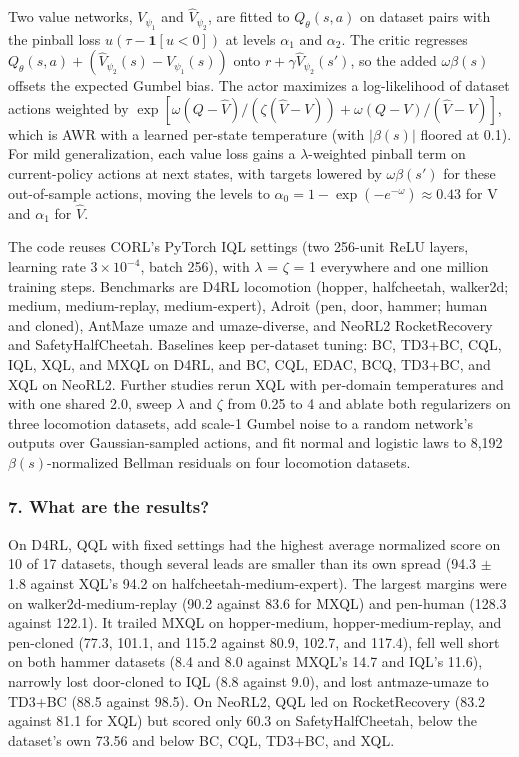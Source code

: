 \documentclass[11pt]{article}
\newcommand{\question}[1]{\subsubsection*{#1}}
\begin{document}
Two value networks, $V_{\psi_1}$ and $\hat{V}_{\psi_2}$, are fitted to $Q_\theta(s, a)$ on dataset pairs with the pinball loss $u(\tau - \mathbf{1}[u < 0])$ at levels $\alpha_{1}$ and $\alpha_{2}$. The critic regresses $Q_\theta(s, a) + (\hat{V}_{\psi_2}(s) - V_{\psi_1}(s))$ onto $r + \gamma \hat{V}_{\psi_2}(s')$, so the added $\omega\beta(s)$ offsets the expected Gumbel bias. The actor maximizes a log-likelihood of dataset actions weighted by $\exp[\omega(Q - \hat{V})/(\zeta(\hat{V} - V)) + \omega(Q - V)/(\hat{V} - V)]$, which is AWR with a learned per-state temperature (with $|\beta(s)|$ floored at 0.1). For mild generalization, each value loss gains a \ensuremath{\lambda}-weighted pinball term on current-policy actions at next states, with targets lowered by $\omega\beta(s')$ for these out-of-sample actions, moving the levels to $\alpha_0 = 1 - \exp(-e^{-\omega}) \approx 0.43$ for V and $\alpha_{1}$ for $\hat{V}$.

The code reuses CORL's PyTorch IQL settings (two 256-unit ReLU layers, learning rate $3 \times 10^{-4}$, batch 256), with \ensuremath{\lambda} = \ensuremath{\zeta} = 1 everywhere and one million training steps. Benchmarks are D4RL locomotion (hopper, halfcheetah, walker2d; medium, medium-replay, medium-expert), Adroit (pen, door, hammer; human and cloned), AntMaze umaze and umaze-diverse, and NeoRL2 RocketRecovery and SafetyHalfCheetah. Baselines keep per-dataset tuning: BC, TD3+BC, CQL, IQL, XQL, and MXQL on D4RL, and BC, CQL, EDAC, BCQ, TD3+BC, and XQL on NeoRL2. Further studies rerun XQL with per-domain temperatures and with one shared 2.0, sweep \ensuremath{\lambda} and \ensuremath{\zeta} from 0.25 to 4 and ablate both regularizers on three locomotion datasets, add scale-1 Gumbel noise to a random network's outputs over Gaussian-sampled actions, and fit normal and logistic laws to 8,192 $\beta(s)$-normalized Bellman residuals on four locomotion datasets.

\question{7. What are the results?}

On D4RL, QQL with fixed settings had the highest average normalized score on 10 of 17 datasets, though several leads are smaller than its own spread (94.3 \ensuremath{\pm} 1.8 against XQL's 94.2 on halfcheetah-medium-expert). The largest margins were on walker2d-medium-replay (90.2 against 83.6 for MXQL) and pen-human (128.3 against 122.1). It trailed MXQL on hopper-medium, hopper-medium-replay, and pen-cloned (77.3, 101.1, and 115.2 against 80.9, 102.7, and 117.4), fell well short on both hammer datasets (8.4 and 8.0 against MXQL's 14.7 and IQL's 11.6), narrowly lost door-cloned to IQL (8.8 against 9.0), and lost antmaze-umaze to TD3+BC (88.5 against 98.5). On NeoRL2, QQL led on RocketRecovery (83.2 against 81.1 for XQL) but scored only 60.3 on SafetyHalfCheetah, below the dataset's own 73.56 and below BC, CQL, TD3+BC, and XQL.
\end{document}
